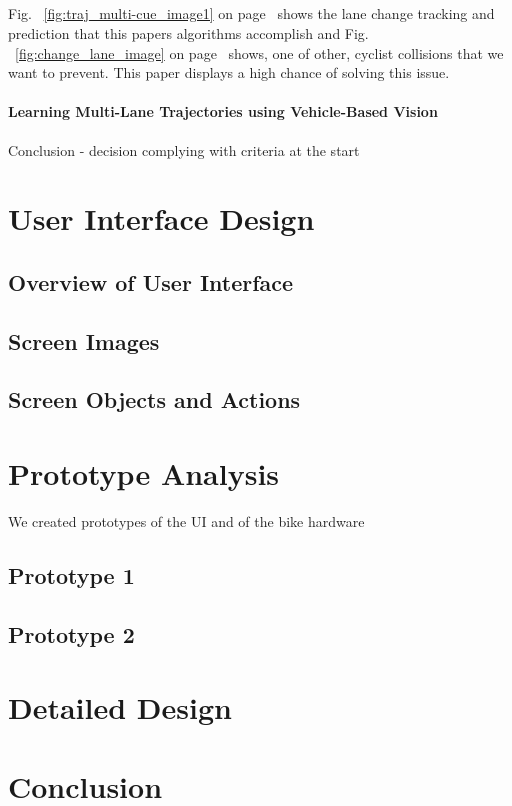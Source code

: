 \documentclass[]{report}
\begin{document}
\paragraph{}

Fig. ~\ref{fig:traj_multi-cue_image1} on page~\pageref{fig:traj_multi-cue_image1} shows the lane change tracking and prediction that this papers algorithms accomplish and Fig. ~\ref{fig:change_lane_image} on page~\pageref{fig:change_lane_image} shows, one of other, cyclist collisions that we want to prevent. This paper displays a high chance of solving this issue.



\subsubsection{Learning Multi-Lane Trajectories using Vehicle-Based Vision \citep{multi-lane_traj}}

Conclusion - decision complying with criteria at the start

\chapter{User Interface Design}
\section{Overview of User Interface}


\paragraph{}

\section{Screen Images}
\section{Screen Objects and Actions}


\chapter{Prototype Analysis}
We created prototypes of the UI and of the bike hardware 
\section{Prototype 1}

\section{Prototype 2}

\chapter{Detailed Design}

\chapter{Conclusion}



\end{document}

